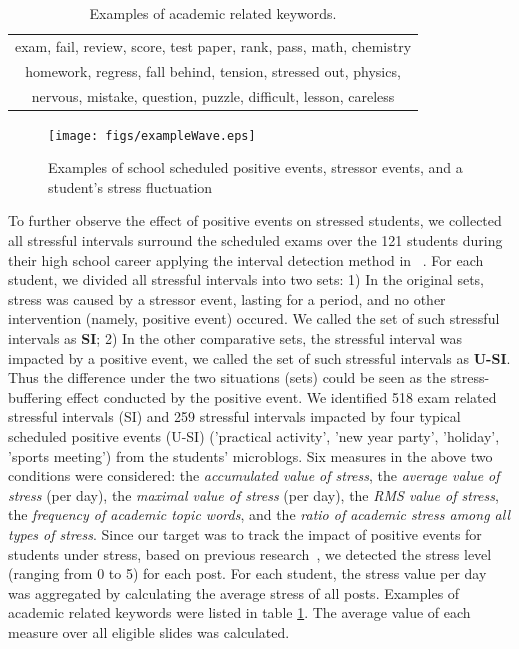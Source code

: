 \begin{table}[h]
\centering
\caption{\small{Examples of academic related keywords.}}
\label{tab:studyWords}
\small{
\begin{tabular}{c}
\toprule
exam, fail, review, score, test paper, rank, pass, math, chemistry\\
homework, regress, fall behind, tension, stressed out, physics,\\
nervous, mistake, question, puzzle, difficult, lesson, careless\\
\bottomrule
\end{tabular}
}
\end{table}


\begin{figure}[H]
\centering
\texttt{[image: figs/exampleWave.eps]}
\caption{\small{Examples of school scheduled positive events, stressor events, and a student's stress fluctuation}}
\label{fig:example}
\end{figure}

To further observe the effect of positive events on stressed students,
we collected all stressful intervals surround the scheduled exams over the 121 students during their high school career
applying the interval detection method in ~\citep{Li2017Analyzing}.
For each student, we divided all stressful intervals into two sets:
1) In the original sets, stress was caused by a stressor event, lasting for a period,
and no other intervention (namely, positive event) occured.
We called the set of such stressful intervals as \textbf{SI};
2) In the other comparative sets,
the stressful interval was impacted by a positive event,
we called the set of such stressful intervals as \textbf{U-SI}.
Thus the difference under the two situations (sets) could be seen as the stress-buffering effect
conducted by the positive event.
We identified 518 exam related stressful intervals (SI)
and 259 stressful intervals impacted by four typical scheduled positive events (U-SI)
('practical activity', 'new year party', 'holiday', 'sports meeting') from the students' microblogs.
Six measures in the above two conditions were considered:
the \emph{accumulated value of stress}, the \emph{average value of stress} (per day),  the \emph{maximal value of stress} (per day), 
the \emph{RMS value of stress},
the \emph{frequency of academic topic words}, and the \emph{ratio of academic stress among all types of stress}.
Since our target was to track the impact of positive events for students under stress,
based on previous research~\cite{XueUbicomp13},
we detected the stress level (ranging from 0 to 5) for each post.
For each student,
the stress value per day was aggregated by calculating the average stress of all posts. 
Examples of academic related keywords were listed in table \ref{tab:studyWords}.
The average value of each measure over all eligible slides was calculated.


